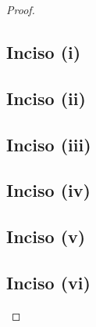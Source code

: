 \begin{proof}
	\subsection{Inciso (i)} \label{problema1_4:inciso1}
	
	\newpage
	
	\subsection{Inciso (ii)}\label{problema1_4:inciso2}
	
	\newpage
		
	\subsection{Inciso (iii)}\label{problema1_4:inciso3}
	
	\newpage
	
	\subsection{Inciso (iv)}\label{problema1_4:inciso4}
	
	\newpage
	
	\subsection{Inciso (v)} \label{problema1_4:inciso5}
	
	\newpage
	
	\subsection{Inciso (vi)}\label{problema1_4:inciso6}
	
\end{proof}